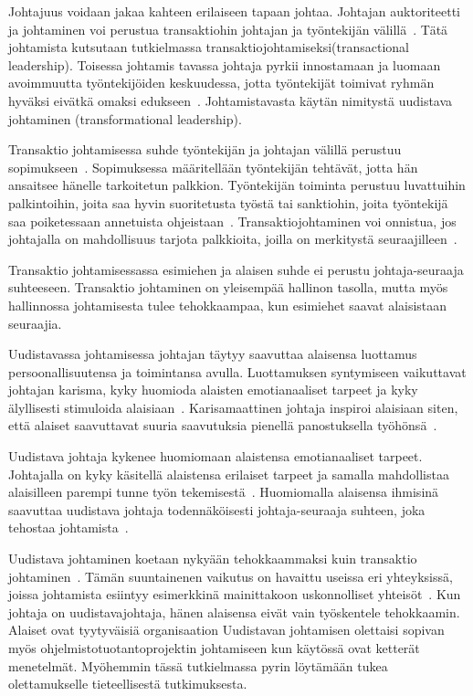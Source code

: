 \documentclass[finnish]{tktltiki2}
\theoremstyle{definition}
\theoremstyle{remark}
\begin{document}
Johtajuus voidaan jakaa kahteen erilaiseen tapaan johtaa. Johtajan auktoriteetti ja johtaminen voi perustua transaktiohin johtajan ja työntekijän välillä~\cite{bass1990transactional}. Tätä johtamista kutsutaan tutkielmassa transaktiojohtamiseksi(transactional leadership). Toisessa johtamis tavassa johtaja pyrkii innostamaan ja luomaan avoimmuutta työntekijöiden keskuudessa, jotta työntekijät toimivat ryhmän hyväksi eivätkä omaksi edukseen~\cite{bass1990transactional}. Johtamistavasta käytän nimitystä uudistava johtaminen (transformational leadership). 

Transaktio johtamisessa suhde työntekijän ja johtajan välillä  perustuu sopimukseen~\cite{bass1990transactional}. Sopimuksessa määritellään työntekijän tehtävät, jotta hän ansaitsee hänelle tarkoitetun palkkion. Työntekijän toiminta perustuu luvattuihin palkintoihin, joita saa hyvin suoritetusta työstä tai sanktiohin, joita työntekijä saa poiketessaan annetuista ohjeistaan~\cite{bass1990transactional}. Transaktiojohtaminen voi onnistua, jos johtajalla on mahdollisuus tarjota palkkioita, joilla on merkitystä seuraajilleen~\cite{bass1990transactional}. 

Transaktio johtamisessassa esimiehen ja alaisen suhde ei perustu johtaja-seuraaja suhteeseen. Transaktio johtaminen on yleisempää hallinon tasolla, mutta myös hallinnossa johtamisesta tulee tehokkaampaa, kun esimiehet saavat alaisistaan seuraajia.  

Uudistavassa johtamisessa johtajan täytyy saavuttaa alaisensa luottamus persoonallisuutensa ja toimintansa avulla. Luottamuksen syntymiseen vaikuttavat johtajan karisma, kyky huomioda alaisten emotianaaliset tarpeet ja kyky älyllisesti stimuloida alaisiaan~\cite{bass1990transactional}. Karisamaattinen johtaja inspiroi alaisiaan siten, että alaiset saavuttavat suuria saavutuksia pienellä panostuksella työhönsä~\cite{bass1990transactional}.

Uudistava johtaja kykenee huomiomaan alaistensa emotianaaliset tarpeet. Johtajalla on kyky käsitellä alaistensa erilaiset tarpeet ja samalla mahdollistaa alaisilleen parempi tunne työn tekemisestä~\cite{palmer2001emotional}. Huomiomalla alaisensa ihmisinä saavuttaa uudistava johtaja todennäköisesti johtaja-seuraaja suhteen, joka tehostaa johtamista~\cite{raccoon2006leadership}.

Uudistava johtaminen koetaan nykyään tehokkaammaksi kuin transaktio johtaminen~\cite{palmer2001emotional}. Tämän suuntainenen vaikutus on havaittu useissa eri yhteyksissä, joissa johtamista esiintyy esimerkkinä mainittakoon uskonnolliset yhteisöt~\cite{bass1990transactional}. Kun johtaja on uudistavajohtaja, hänen alaisensa eivät vain työskentele tehokkaamin. Alaiset ovat tyytyväisiä organisaation  Uudistavan johtamisen olettaisi sopivan myös ohjelmistotuotantoprojektin johtamiseen kun käytössä ovat ketterät menetelmät. Myöhemmin tässä tutkielmassa pyrin löytämään tukea olettamukselle tieteellisestä tutkimuksesta. 
\end{document}
